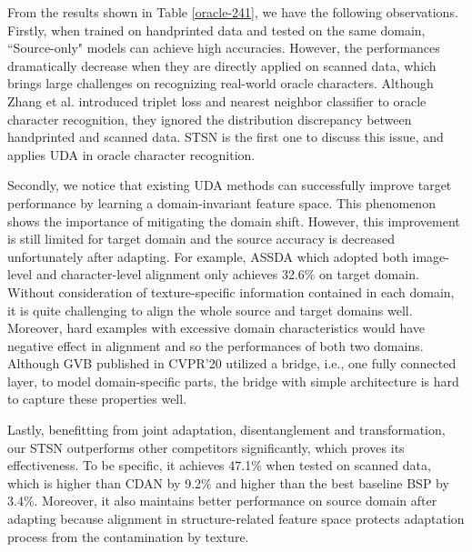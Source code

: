 \documentclass[10pt,journal,compsoc,twocolumn ]{IEEEtran}
\begin{document}
From the results shown in Table \ref{oracle-241}, we have the following observations. Firstly, when trained on handprinted data and tested on the same domain, ``Source-only" models can achieve high accuracies. However, the performances dramatically decrease when they are directly applied on scanned data, which brings large challenges on recognizing real-world oracle characters. %
Although Zhang et al. \cite{zhang2019oracle} introduced triplet loss and nearest neighbor classifier to oracle character recognition, they ignored the distribution discrepancy between handprinted and scanned data. STSN is the first one to discuss this issue, and applies UDA in oracle character recognition.

Secondly, we notice that existing UDA methods can successfully improve target performance by learning a domain-invariant feature space. %
This phenomenon shows the importance of mitigating the domain shift. However, this improvement is still limited for target domain and the source accuracy is decreased unfortunately after adapting. For example, ASSDA \cite{zhang2021robust} which adopted both image-level and character-level alignment only achieves 32.6\% on target domain. Without consideration of texture-specific information contained in each domain, it is quite challenging to align the whole source and target domains well. Moreover, hard examples with excessive domain characteristics would have negative effect in alignment and so the performances of both two domains. Although GVB \cite{cui2020gradually} published in CVPR'20 utilized a bridge, i.e., one fully connected layer, to model domain-specific parts, the bridge with simple architecture is hard to capture these properties well.

Lastly, benefitting from joint adaptation, disentanglement and transformation, our STSN outperforms other competitors significantly, which proves its effectiveness. To be specific, it achieves 47.1\%  when tested on scanned data, which is higher than CDAN \cite{long2018conditional} by 9.2\% and higher than the best baseline BSP \cite{chen2019transferability} by 3.4\%. Moreover, it also maintains better performance on source domain after adapting because alignment in structure-related feature space protects adaptation process from the contamination by texture.
\end{document}
